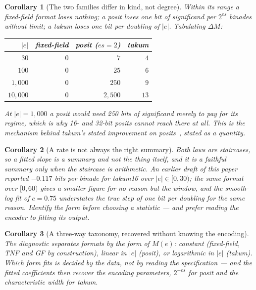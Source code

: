 \documentclass[11pt]{article}
\newtheorem{corollary}{Corollary}
\theoremstyle{definition}
\begin{document}
\begin{corollary}[The two families differ in kind, not degree]
Within its range a fixed-field format loses nothing; a posit loses one bit of
significand per $2^{es}$ binades without limit; a takum loses one bit per
\emph{doubling} of $|e|$. Tabulating $\Delta M$:

\begin{center}
\begin{tabular}{rrrr}
\toprule
$|e|$ & fixed-field & posit ($es{=}2$) & takum \\
\midrule
$30$      & $0$ & $7$    & $4$ \\
$100$     & $0$ & $25$   & $6$ \\
$1{,}000$   & $0$ & $250$  & $9$ \\
$10{,}000$  & $0$ & $2{,}500$ & $13$ \\
\bottomrule
\end{tabular}
\end{center}

At $|e| = 1{,}000$ a posit would need 250 bits of significand merely to pay for
its regime, which is why 16- and 32-bit posits cannot reach there at all. This is
the mechanism behind takum's stated improvement on posits~\cite{takum}, stated as
a quantity.
\end{corollary}

\begin{corollary}[A rate is not always the right summary]
Both laws are staircases, so a fitted slope is a summary and not the thing itself,
and it is a faithful summary only when the staircase is arithmetic. An earlier
draft of this paper reported $-0.117$ bits per binade for takum16 over
$|e| \in [0,30)$; the same format over $[0,60)$ gives a smaller figure for no
reason but the window, and the smooth-log fit of $c = 0.75$ understates the true
step of one bit per doubling for the same reason. Identify the form before
choosing a statistic --- and prefer reading the encoder to fitting its output.
\end{corollary}

\begin{corollary}[A three-way taxonomy, recovered without knowing the encoding]
The diagnostic separates formats by the \emph{form} of $M(e)$: constant
(fixed-field, TNF and GF by construction), linear in $|e|$ (posit), or
logarithmic in $|e|$ (takum). Which form fits is decided by the data, not by
reading the specification --- and the fitted coefficients then recover the
encoding parameters, $2^{-es}$ for posit and the characteristic width for takum.
\end{corollary}
\end{document}

